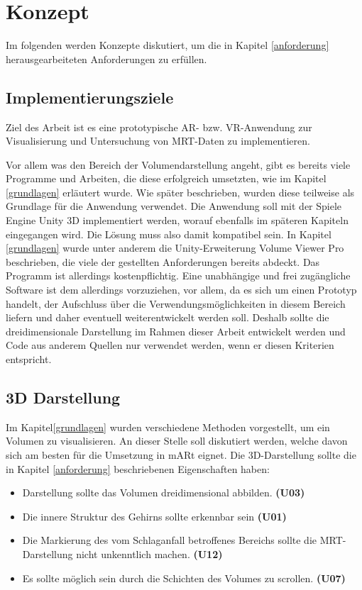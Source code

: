 
\chapter{Konzept}
\label{konzept}

Im folgenden werden Konzepte diskutiert, um die in Kapitel \ref{anforderung} herausgearbeiteten Anforderungen zu erfüllen.

\section{Implementierungsziele}
Ziel des Arbeit ist es eine prototypische AR- bzw. VR-Anwendung zur Visualisierung und Untersuchung von MRT-Daten zu implementieren. 

Vor allem was den Bereich der Volumendarstellung angeht, gibt es bereits viele Programme und Arbeiten, die diese erfolgreich umsetzten, wie im Kapitel \ref{grundlagen} erläutert wurde.
Wie später beschrieben, wurden diese teilweise als Grundlage für die Anwendung verwendet. Die Anwendung soll mit der Spiele Engine Unity 3D implementiert werden, worauf ebenfalls im späteren Kapiteln eingegangen wird. Die Lösung muss also damit kompatibel sein. In Kapitel \ref{grundlagen} wurde unter anderem die Unity-Erweiterung Volume Viewer Pro beschrieben, die viele der gestellten Anforderungen bereits abdeckt. Das Programm ist allerdings kostenpflichtig. Eine unabhängige und frei zugängliche Software ist dem allerdings vorzuziehen, vor allem, da es sich um einen Prototyp handelt, der Aufschluss über die Verwendungsmöglichkeiten in diesem Bereich liefern und daher eventuell weiterentwickelt werden soll. Deshalb sollte die dreidimensionale Darstellung im Rahmen dieser Arbeit entwickelt werden und Code aus anderem Quellen nur verwendet werden, wenn er diesen Kriterien entspricht.

\section{3D Darstellung}

Im Kapitel\ref{grundlagen} wurden verschiedene Methoden vorgestellt, um ein Volumen zu visualisieren. An dieser Stelle soll diskutiert werden, welche davon sich am besten für die Umsetzung in mARt eignet.
Die 3D-Darstellung sollte die in Kapitel \ref{anforderung} beschriebenen Eigenschaften haben:

\begin{itemize}
\item Darstellung sollte das Volumen dreidimensional abbilden. \textbf{(U03)}
\item Die innere Struktur des Gehirns sollte erkennbar sein \textbf{(U01)}
\item Die Markierung des vom Schlaganfall betroffenes Bereichs sollte die MRT-Darstellung nicht unkenntlich machen. \textbf{(U12)}
\item Es sollte möglich sein durch die Schichten des Volumes zu scrollen. \textbf{(U07)}
\end{itemize}

